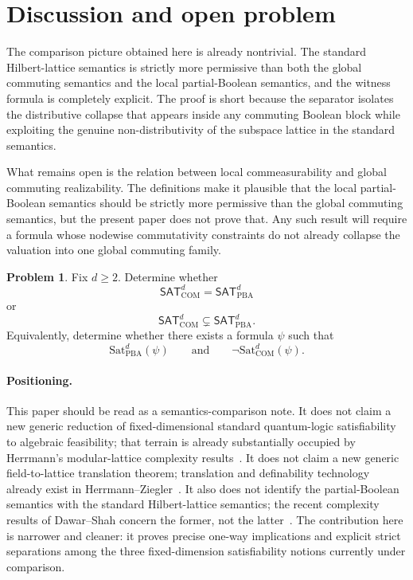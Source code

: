 \documentclass[11pt]{article}
\theoremstyle{plain}
\theoremstyle{definition}
\newtheorem{problem}[theorem]{Problem}
\newcommand{\COM}{\mathrm{COM}}
\newcommand{\PBA}{\mathrm{PBA}}
\newcommand{\Sat}{\mathrm{Sat}}
\begin{document}
\section{Discussion and open problem}

The comparison picture obtained here is already nontrivial.
The standard Hilbert-lattice semantics is strictly more permissive than both the global commuting semantics and the local partial-Boolean semantics, and the witness formula is completely explicit.
The proof is short because the separator isolates the distributive collapse that appears inside any commuting Boolean block while exploiting the genuine non-distributivity of the subspace lattice in the standard semantics.

What remains open is the relation between local commeasurability and global commuting realizability.
The definitions make it plausible that the local partial-Boolean semantics should be strictly more permissive than the global commuting semantics, but the present paper does not prove that.
Any such result will require a formula whose nodewise commutativity constraints do not already collapse the valuation into one global commuting family.

\begin{problem}
Fix $d\geq 2$.
Determine whether
\[
\mathsf{SAT}_{\COM}^d = \mathsf{SAT}_{\PBA}^d
\]
or
\[
\mathsf{SAT}_{\COM}^d \subsetneq \mathsf{SAT}_{\PBA}^d.
\]
Equivalently, determine whether there exists a formula $\psi$ such that
\[
\Sat_{\PBA}^d(\psi)
\qquad\text{and}\qquad
\neg\Sat_{\COM}^d(\psi).
\]
\end{problem}

\paragraph{Positioning.}
This paper should be read as a semantics-comparison note.
It does not claim a new generic reduction of fixed-dimensional standard quantum-logic satisfiability to algebraic feasibility; that terrain is already substantially occupied by Herrmann's modular-lattice complexity results~\cite{Herrmann2022}.
It does not claim a new generic field-to-lattice translation theorem; translation and definability technology already exist in Herrmann--Ziegler~\cite{HerrmannZiegler2018,HerrmannZiegler2019}.
It also does not identify the partial-Boolean semantics with the standard Hilbert-lattice semantics; the recent complexity results of Dawar--Shah concern the former, not the latter~\cite{DawarShah2026}.
The contribution here is narrower and cleaner: it proves precise one-way implications and explicit strict separations among the three fixed-dimension satisfiability notions currently under comparison.
\end{document}
